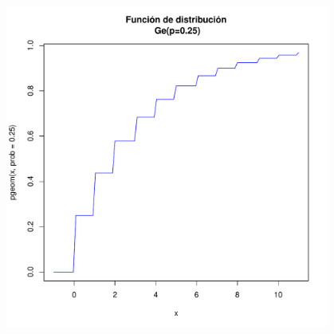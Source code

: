 \documentclass[handout]{beamer}\usepackage[]{graphicx}\usepackage[]{color}
\newenvironment{knitrout}{}{} %
\theoremstyle{plain}
\theoremstyle{definition}
\begin{document}
\begin{frame}[fragile]

\begin{knitrout}
\color{fgcolor}
\includegraphics[width=0.8\textwidth]{figure/unnamed-chunk-9-1} 

\end{knitrout}

\end{frame}
\end{document}
